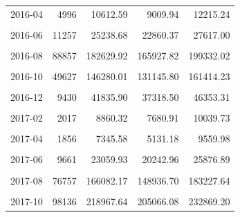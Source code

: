 \begin{longtable}[t]{crrrr}
2016-04 & 4996 & 10612.59 & 9009.94 & 12215.24\\
\cellcolor{gray!10}{2016-05} & \cellcolor{gray!10}{6209} & \cellcolor{gray!10}{14181.55} & \cellcolor{gray!10}{12675.04} & \cellcolor{gray!10}{15688.06}\\
2016-06 & 11257 & 25238.68 & 22860.37 & 27617.00\\
\cellcolor{gray!10}{2016-07} & \cellcolor{gray!10}{30233} & \cellcolor{gray!10}{83317.33} & \cellcolor{gray!10}{76226.43} & \cellcolor{gray!10}{90408.24}\\
2016-08 & 88857 & 182629.92 & 165927.82 & 199332.02\\
\cellcolor{gray!10}{2016-09} & \cellcolor{gray!10}{95945} & \cellcolor{gray!10}{233447.89} & \cellcolor{gray!10}{210895.34} & \cellcolor{gray!10}{256000.45}\\
2016-10 & 49627 & 146280.01 & 131145.80 & 161414.23\\
\cellcolor{gray!10}{2016-11} & \cellcolor{gray!10}{26459} & \cellcolor{gray!10}{82016.28} & \cellcolor{gray!10}{74339.55} & \cellcolor{gray!10}{89693.01}\\
2016-12 & 9430 & 41835.90 & 37318.50 & 46353.31\\
\cellcolor{gray!10}{2017-01} & \cellcolor{gray!10}{3627} & \cellcolor{gray!10}{15467.28} & \cellcolor{gray!10}{12938.51} & \cellcolor{gray!10}{17996.05}\\
2017-02 & 2017 & 8860.32 & 7680.91 & 10039.73\\
\cellcolor{gray!10}{2017-03} & \cellcolor{gray!10}{1859} & \cellcolor{gray!10}{8637.95} & \cellcolor{gray!10}{7034.64} & \cellcolor{gray!10}{10241.26}\\
2017-04 & 1856 & 7345.58 & 5131.18 & 9559.98\\
\cellcolor{gray!10}{2017-05} & \cellcolor{gray!10}{4859} & \cellcolor{gray!10}{12065.21} & \cellcolor{gray!10}{10183.47} & \cellcolor{gray!10}{13946.95}\\
2017-06 & 9661 & 23059.93 & 20242.96 & 25876.89\\
\cellcolor{gray!10}{2017-07} & \cellcolor{gray!10}{23567} & \cellcolor{gray!10}{62064.99} & \cellcolor{gray!10}{58416.03} & \cellcolor{gray!10}{65713.96}\\
2017-08 & 76757 & 166082.17 & 148936.70 & 183227.64\\
\cellcolor{gray!10}{2017-09} & \cellcolor{gray!10}{202308} & \cellcolor{gray!10}{341865.03} & \cellcolor{gray!10}{312471.96} & \cellcolor{gray!10}{371258.10}\\
2017-10 & 98136 & 218967.64 & 205066.08 & 232869.20\\

\end{longtable}
